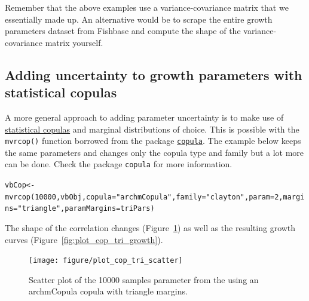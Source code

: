 \documentclass[a4paper,english,10pt]{article}\usepackage[]{graphicx}\usepackage[]{color}
\makeatletter
\newcommand{\hlnum}[1]{\textcolor[rgb]{0.2,0.2,0.2}{#1}}%
\newcommand{\hlstr}[1]{\textcolor[rgb]{0.2,0.2,0.2}{#1}}%
\newcommand{\hlstd}[1]{\textcolor[rgb]{0,0,0}{#1}}%
\newcommand{\hlkwb}[1]{\textcolor[rgb]{0.361,0.506,0.596}{#1}}%
\newcommand{\hlkwc}[1]{\textcolor[rgb]{0.361,0.506,0.596}{#1}}%
\newcommand{\hlkwd}[1]{\textcolor[rgb]{0.361,0.506,0.596}{#1}}%
\newenvironment{kframe}{%
 \def\at@end@of@kframe{}%
 \ifinner\ifhmode%
  \def\at@end@of@kframe{\end{minipage}}%
  \begin{minipage}{\columnwidth}%
 \fi\fi%
 \def\FrameCommand##1{\hskip\@totalleftmargin \hskip-\fboxsep
 \colorbox{shadecolor}{##1}\hskip-\fboxsep
     \hskip-\linewidth \hskip-\@totalleftmargin \hskip\columnwidth}%
 \MakeFramed {\advance\hsize-\width
   \@totalleftmargin\z@ \linewidth\hsize
   \@setminipage}}%
 {\par\unskip\endMakeFramed%
 \at@end@of@kframe}
\newenvironment{knitrout}{}{} %
\newcommand{\code}[1]{{\texttt{#1}}}
\newcommand{\pkg}[1]{{\texttt{#1}}}
\makeatother
\begin{document}
Remember that the above examples use a variance-covariance matrix that we essentially made up. An alternative would be to scrape the entire growth parameters dataset from Fishbase and compute the shape of the variance-covariance matrix yourself.

\subsection{Adding uncertainty to growth parameters with statistical copulas}

A more general approach to adding parameter uncertainty is to make use of \href{http://www.encyclopediaofmath.org/index.php/Copula}{statistical copulas} and marginal distributions of choice. This is possible with the \code{mvrcop()} function borrowed from the package \href{http://cran.r-project.org/web/packages/copula/}{\pkg{copula}}. The example below keeps the same parameters and changes only the copula type and family but a lot more can be done. Check the package \pkg{copula} for more information. 


\begin{knitrout}
\color{fgcolor}\begin{kframe}
\begin{alltt}
\hlstd{vbCop} \hlkwb{<-} \hlkwd{mvrcop}\hlstd{(}\hlnum{10000}\hlstd{, vbObj,} \hlkwc{copula}\hlstd{=}\hlstr{"archmCopula"}\hlstd{,} \hlkwc{family}\hlstd{=}\hlstr{"clayton"}\hlstd{,} \hlkwc{param}\hlstd{=}\hlnum{2}\hlstd{,} \hlkwc{margins}\hlstd{=}\hlstr{"triangle"}\hlstd{,} \hlkwc{paramMargins}\hlstd{=triPars)}
\end{alltt}
\end{kframe}
\end{knitrout}

The shape of the correlation changes (Figure~\ref{fig:plot_cop_tri_scatter}) as well as the resulting growth curves (Figure~\ref{fig:plot_cop_tri_growth}). 

\begin{knitrout}
\color{fgcolor}\begin{kframe}


{\ttfamily\noindent\bfseries\color{errorcolor}{\#\# Error: Viewport 'plot\_01.panel.1.1.off.vp' was not found}}\end{kframe}\begin{figure}[H]


{\centering \texttt{[image: figure/plot\_cop\_tri\_scatter]} 

}

\caption[Scatter plot of the 10000 samples parameter from the using an archmCopula copula with triangle margins]{Scatter plot of the 10000 samples parameter from the using an archmCopula copula with triangle margins.\label{fig:plot_cop_tri_scatter}}
\end{figure}


\end{knitrout}
\end{document}
